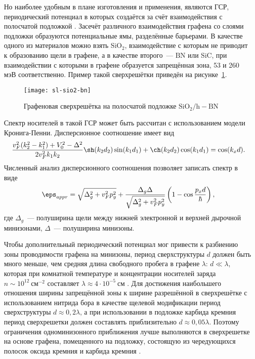 Но наиболее удобным в плане изготовления и применения, являются ГСР, периодический потенциал в которых создаётся за счёт взаимодействия с полосчатой подложкой \cite{ratnikov}. Засечёт различного взаимодействия графена со слоями подложки образуются потенциальные ямы, разделённые барьерами. В качестве одного из материалов можно взять \( \mathrm{SiO_2} \), взаимодействие с которым не приводит к образованию щели в графене, а в качестве второго~--- \( \mathrm{BN} \) или \( \mathrm{SiC} \), при взаимодействии с которыми в графене образуется запрещённая зона, 53 и 260 мэВ соответственно. Пример такой сверхрешётки приведён на рисунке~\ref{fig:sl-sio2-bn}.
\begin{figure}[ht]
  \center
  \texttt{[image: sl-sio2-bn]}
  \caption{Графеновая сверхрешётка на полосчатой подложке \( \mathrm{SiO_2/h-BN} \)}
  \label{fig:sl-sio2-bn}
\end{figure}

Спектр носителей в такой ГСР может быть рассчитан с использованием модели Кронига-Пенни. Дисперсионное соотношение имеет вид \cite{ratnikov}
\begin{equation*}
  \frac{v_F^2(k_2^2-k_1^2) + V_0^2 - \Delta^2}{2v_F^2k_1k_2}\sh(k_2d_2)\sin(k_1d_1) + \ch(k_2d_2)\cos(k_1d_1) = \cos(k_x d).
\end{equation*}
Численный анализ дисперсионного соотношения позволяет записать спектр в виде \cite{gsl-sio2-sic}
\begin{equation*}
  \eps_{appr} = \sqrt{\Delta_g^2 + v_F^2 p_y^2} + \frac{\Delta_g\Delta}{\sqrt{\Delta_g^2 + v_F^2 p_y^2}}\left(1-\cos\frac{p_x d}{\hbar}\right),
\end{equation*}
где \( \Delta_g \)~--- полуширина щели между нижней электронной и верхней дырочной минизонами, \( \Delta \)~--- полуширина минизоны.

Чтобы дополнительный периодический потенциал мог привести к разбиению зоны проводимости графена на минизоны, период сверхструктуры \(d\) должен быть много меньше, чем средняя длина свободного пробега в графене \(\lambda\): \(d \ll \lambda\), которая при комнатной температуре и концентрации носителей заряда \(n \sim 10^{12}~\text{см}^{-2}\) составляет \(\lambda \approx 4 \cdot 10^{-5}~\text{см} \) \cite{novoselov-geim}. Для достижения наибольшего отношения ширины запрещённой зоны к ширине разрешённой в сверхрешётке с использованием нитрида бора в качестве щелевой модификации период сверхструктуры \( d\approx0,\!2\lambda\), а при использовании в подложке карбида кремния период сверхрешетки должен составлять приблизительно \(d\approx0,\!05\lambda\). Поэтому ограничения одноминизонного приближения лучше выполняются в сверхрешетке на основе графена, помещенного на подложку, состоящую из чередующихся полосок оксида кремния и карбида кремния \cite{gsl-sio2-sic}.


